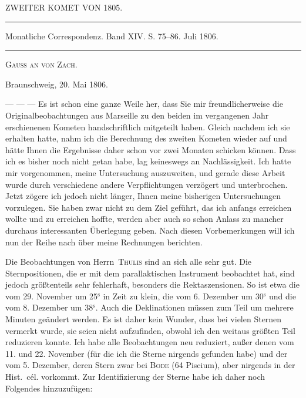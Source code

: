 \clearpage
{}
\hypertarget{native-275-lower}{}
\begin{center}
ZWEITER KOMET VON 1805.

\rule{0.6\linewidth}{0.4pt}

Monatliche Correspondenz. Band XIV. S. 75–86. Juli 1806.

\rule{0.6\linewidth}{0.4pt}

\textsc{Gauss an von Zach.}
\end{center}
\begin{flushright}
Braunschweig, 20. Mai 1806.
\end{flushright}

\par\indent --- --- --- Es ist schon eine ganze Weile her, dass Sie mir freundlicherweise die Originalbeobachtungen aus Marseille zu den beiden im vergangenen Jahr erschienenen Kometen handschriftlich mitgeteilt haben. Gleich nachdem ich sie erhalten hatte, nahm ich die Berechnung des zweiten Kometen wieder auf und hätte Ihnen die Ergebnisse daher schon vor zwei Monaten schicken können. Dass ich es bisher noch nicht getan habe, lag keineswegs an Nachlässigkeit. Ich hatte mir vorgenommen, meine Untersuchung auszuweiten, und gerade diese Arbeit wurde durch verschiedene andere Verpflichtungen verzögert und unterbrochen. Jetzt zögere ich jedoch nicht länger, Ihnen meine bisherigen Untersuchungen vorzulegen. Sie haben zwar nicht zu dem Ziel geführt, das ich anfangs erreichen wollte und zu erreichen hoffte, werden aber auch so schon Anlass zu mancher durchaus interessanten Überlegung geben. Nach diesen Vorbemerkungen will ich nun der Reihe nach über meine Rechnungen berichten.

\par\indent Die Beobachtungen von Herrn~\textsc{Thulis} sind an sich alle sehr gut. Die Sternpositionen, die er mit dem parallaktischen Instrument beobachtet hat, sind jedoch größtenteils sehr fehlerhaft, besonders die Rektaszensionen. So ist etwa die vom 29. November um 25$^{\mathrm{s}}$ in Zeit zu klein, die vom 6. Dezember um 30$^{\mathrm{s}}$ und die vom 8. Dezember um 38$^{\mathrm{s}}$. Auch die Deklinationen müssen zum Teil um mehrere Minuten geändert werden. Es ist daher kein Wunder, dass bei vielen Sternen vermerkt wurde, sie seien nicht aufzufinden, obwohl ich den weitaus größten Teil reduzieren konnte. Ich habe alle Beobachtungen neu reduziert, außer denen vom 11. und 22. November (für die ich
%
die Sterne nirgends gefunden habe) und der vom 5. Dezember, deren Stern zwar bei \textsc{Bode} (64 Piscium), aber nirgends in der Hist.\ cél. vorkommt. Zur Identifizierung der Sterne habe ich daher noch Folgendes hinzuzufügen:


